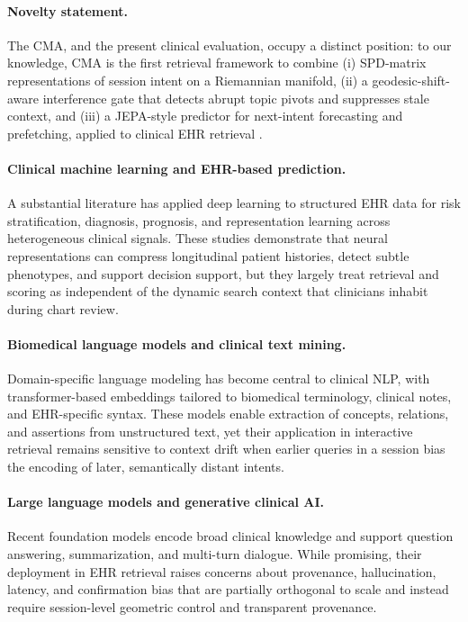 \documentclass[preprint,12pt]{elsarticle}
\begin{document}
\paragraph{Novelty statement.} The CMA, and the present clinical evaluation, occupy a distinct position: to our knowledge, CMA is the first retrieval framework to combine (i) SPD-matrix representations of session intent on a Riemannian manifold, (ii) a geodesic-shift-aware interference gate that detects abrupt topic pivots and suppresses stale context, and (iii) a JEPA-style predictor for next-intent forecasting and prefetching, applied to clinical EHR retrieval \citep{cma2026}.

\paragraph{Clinical machine learning and EHR-based prediction.}
A substantial literature has applied deep learning to structured EHR data for risk stratification, diagnosis, prognosis, and representation learning across heterogeneous clinical signals. \citep{chapman09,wang18,ouztzn25,campagner25,kwon24,zhou00,yue24,su26,yu25,mesinovic26,zhang26,liu26,chen26,zhang21,manthena24,liu25,woo25,sharma25,jayasurya26,ghosh00,vahdani25,lee20,hons24,thorlund20,mao20,chevance20,schwamm20,quarta25} These studies demonstrate that neural representations can compress longitudinal patient histories, detect subtle phenotypes, and support decision support, but they largely treat retrieval and scoring as independent of the dynamic search context that clinicians inhabit during chart review.

\paragraph{Biomedical language models and clinical text mining.}
Domain-specific language modeling has become central to clinical NLP, with transformer-based embeddings tailored to biomedical terminology, clinical notes, and EHR-specific syntax. \citep{zhou22,yao25,urooj25,chen25,nazi24,chow25,AlSaad2024Multimodal,Nagarajan2024Economics,Zhang2025Revolutionizing,yang25,mcduff25,mehandru24,zhou25,zhou25a} These models enable extraction of concepts, relations, and assertions from unstructured text, yet their application in interactive retrieval remains sensitive to context drift when earlier queries in a session bias the encoding of later, semantically distant intents.

\paragraph{Large language models and generative clinical AI.}
Recent foundation models encode broad clinical knowledge and support question answering, summarization, and multi-turn dialogue. \citep{logan2026,agweyu25,ying00,chen25a} While promising, their deployment in EHR retrieval raises concerns about provenance, hallucination, latency, and confirmation bias that are partially orthogonal to scale and instead require session-level geometric control and transparent provenance.
\end{document}
